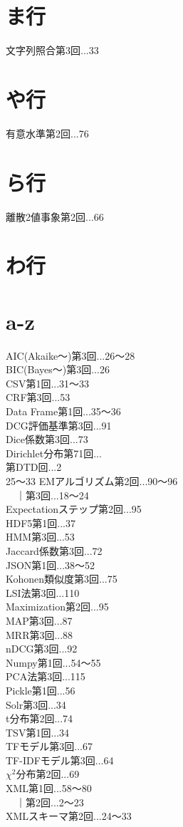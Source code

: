 \documentclass[a4paper,twocolumn,10pt]{jarticle}
\newcommand{\dix}[3]{#1\hspace{\fill}第#2回...#3\\}
\newcommand{\adddix}[2]{　｜\hspace{\fill}第#1回...#2\\}
\begin{document}
\section*{ま行}
\dix{文字列照合}{3}{33}
\section*{や行}
\dix{有意水準}{2}{76~}
\section*{ら行}
\dix{離散2値事象}{2}{66}
\section*{わ行}
\section*{a-z}
\dix{AIC(Akaike〜)}{3}{26〜28}
\dix{BIC(Bayes〜)}{3}{26}
\dix{CSV}{1}{31〜33}
\dix{CRF}{3}{53}
\dix{Data Frame}{1}{35〜36}
\dix{DCG評価基準}{3}{91}
\dix{Dice係数}{3}{73}
\dix{Dirichlet分布}{71}
\dix{DTD}{2}{25〜33}
\dix{EMアルゴリズム}{2}{90〜96}
\adddix{3}{18〜24}
\dix{Expectationステップ}{2}{95}
\dix{HDF5}{1}{37}
\dix{HMM}{3}{53}
\dix{Jaccard係数}{3}{72}
\dix{JSON}{1}{38〜52}
\dix{Kohonen類似度}{3}{75}
\dix{LSI法}{3}{110}
\dix{Maximization}{2}{95}
\dix{MAP}{3}{87}
\dix{MRR}{3}{88}
\dix{nDCG}{3}{92}
\dix{Numpy}{1}{54〜55}
\dix{PCA法}{3}{115}
\dix{Pickle}{1}{56}
\dix{Solr}{3}{34}
\dix{t分布}{2}{74}
\dix{TSV}{1}{34}
\dix{TFモデル}{3}{67}
\dix{TF-IDFモデル}{3}{64}
\dix{\begin{math}χ^2\end{math}分布}{2}{69}
\dix{XML}{1}{58〜80}
\adddix{2}{2〜23}
\dix{XMLスキーマ}{2}{24〜33}
\end{document}

